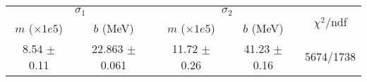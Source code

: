 \begin{tabular}{cc|cc||c}
\multicolumn{2}{c|}{$\sigma_1$} & \multicolumn{2}{|c}{$\sigma_2$} & \multirow{2}{*}{$\chi^2/$ndf} \\
$m$ ($\times1e5$) & $b$ (MeV) & $m$ ($\times1e5$) & $b$ (MeV) & \\
\hline
8.54 $\pm$ 0.11 & 22.863 $\pm$ 0.061 & 11.72 $\pm$ 0.26 & 41.23 $\pm$ 0.16 & 5674/1738\\
\end{tabular}
